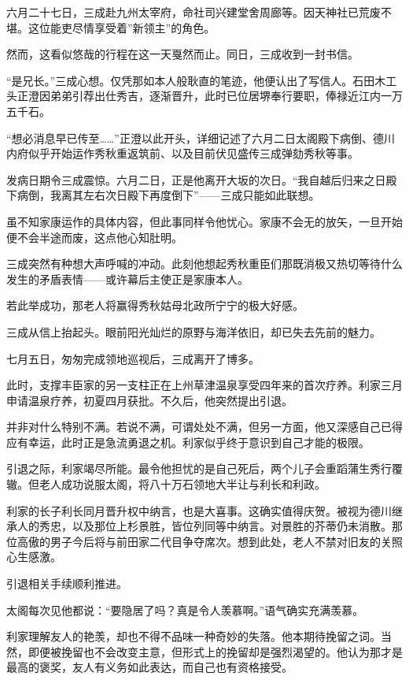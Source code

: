 \documentclass[
]{book}
\begin{document}
六月二十七日，三成赴九州太宰府，命社司兴建堂舍周廊等。因天神社已荒废不堪。这位能吏尽情享受着''新领主''的角色。

然而，这看似悠哉的行程在这一天戛然而止。同日，三成收到一封书信。

``是兄长。''三成心想。仅凭那如本人般耿直的笔迹，他便认出了写信人。石田木工头正澄因弟弟引荐出仕秀吉，逐渐晋升，此时已位居堺奉行要职，俸禄近江内一万五千石。

``想必消息早已传至\ldots\ldots{}''正澄以此开头，详细记述了六月二日太阁殿下病倒、德川内府似乎开始运作秀秋重返筑前、以及目前伏见盛传三成弹劾秀秋等事。

发病日期令三成震惊。六月二日，正是他离开大坂的次日。``我自越后归来之日殿下病倒，我离其左右次日殿下再度倒下''------三成只能如此联想。

虽不知家康运作的具体内容，但此事同样令他忧心。家康不会无的放矢，一旦开始便不会半途而废，这点他心知肚明。

三成突然有种想大声呼喊的冲动。此刻他想起秀秋重臣们那既消极又热切等待什么发生的矛盾表情------或许幕后主使正是家康本人。

若此举成功，那老人将赢得秀秋姑母北政所宁宁的极大好感。

三成从信上抬起头。眼前阳光灿烂的原野与海洋依旧，却已失去先前的魅力。

七月五日，匆匆完成领地巡视后，三成离开了博多。

此时，支撑丰臣家的另一支柱正在上州草津温泉享受四年来的首次疗养。利家三月申请温泉疗养，初夏四月获批。不久后，他突然提出引退。

并非对什么特别不满。若说不满，可谓处处不满，但另一方面，他又深感自己已得应有幸运，此时正是急流勇退之机。利家似乎终于意识到自己才能的极限。

引退之际，利家竭尽所能。最令他担忧的是自己死后，两个儿子会重蹈蒲生秀行覆辙。但老人成功说服太阁，将八十万石领地大半让与利长和利政。

利家的长子利长同月晋升权中纳言，也是大喜事。这确实值得庆贺。被视为德川继承人的秀忠，以及那位上杉景胜，皆位列同等中纳言。对景胜的芥蒂仍未消散。那位高傲的男子今后将与前田家二代目争夺席次。想到此处，老人不禁对旧友的关照心生感激。

引退相关手续顺利推进。

太阁每次见他都说：``要隐居了吗？真是令人羡慕啊。''语气确实充满羡慕。

利家理解友人的艳羡，却也不得不品味一种奇妙的失落。他本期待挽留之词。当然，即便被挽留也不会改变主意，但形式上的挽留却是强烈渴望的。他认为那才是最高的褒奖，友人有义务如此表达，而自己也有资格接受。
\end{document}

